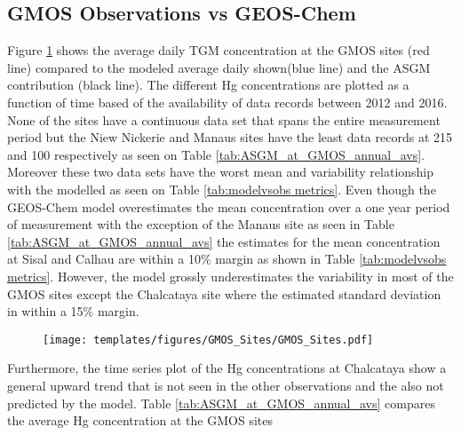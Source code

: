 \subsection{GMOS Observations vs GEOS-Chem}
\begin{flushleft}
Figure \ref{fig:GMOSvsGC} shows the average daily TGM concentration at the GMOS sites (red line) compared to the modeled \on average daily \hg shown(blue line) and the ASGM contribution (black line). The different Hg concentrations are plotted as a function of time based of the availability of data records between 2012 and 2016. None of the sites have a continuous data set that spans the entire measurement period but the Niew Nickerie and Manaus sites have the least data records at 215 and 100 respectively as seen on Table \ref{tab:ASGM_at_GMOS_annual_avs}. Moreover these two data sets have the worst mean and variability relationship with the modelled \hg as seen on Table \ref{tab:modelvsobs metrics}. Even though the GEOS-Chem model overestimates the mean concentration over a one year period of measurement with the exception of the Manaus site as seen in Table \ref{tab:ASGM_at_GMOS_annual_avs} the estimates for the mean concentration at Sisal and Calhau are within a 10\% margin as shown in Table \ref{tab:modelvsobs metrics}. However, the model grossly underestimates the variability in most of the GMOS sites except the Chalcataya site where the estimated standard deviation in within a 15\% margin.  
\end{flushleft}


\begin{figure}[H]
\texttt{[image: templates/figures/GMOS\_Sites/GMOS\_Sites.pdf]}
\centering
{}
\label{fig:GMOSvsGC}
\end{figure}
\FloatBarrier

\begin{flushleft}
 Furthermore, the time series plot of the Hg concentrations at Chalcataya show a general upward trend that is not seen in the other observations and the also not predicted by the model. Table \ref{tab:ASGM_at_GMOS_annual_avs} compares the average  Hg concentration at the GMOS sites 
\end{flushleft}


